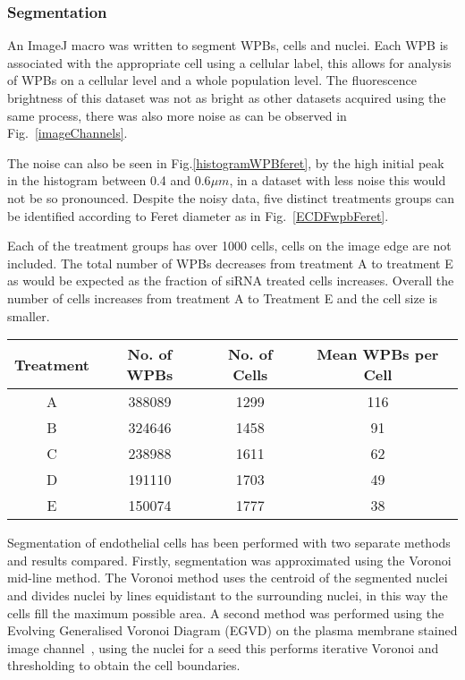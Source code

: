 \subsubsection{Segmentation}
An ImageJ macro was written to segment WPBs, cells and nuclei. Each WPB is associated with the appropriate cell using a cellular label, this allows for analysis of WPBs on a cellular level and a whole population level. The fluorescence brightness of this dataset was not as bright as other datasets acquired using the same process, there was also more noise as can be observed in Fig.~\ref{imageChannels}. 

The noise can also be seen in Fig.\ref{histogramWPBferet}, by the high initial peak in the histogram between 0.4 and 0.6$\mu m$, in a dataset with less noise this would not be so pronounced. Despite the noisy data, five distinct treatments groups can be identified according to Feret diameter as in Fig.~\ref{ECDFwpbFeret}.

Each of the treatment groups has over 1000 cells, cells on the image edge are not included. The total number of WPBs decreases from treatment A to treatment E as would be expected as the fraction of siRNA treated cells increases. Overall the number of cells increases from treatment A to Treatment E and the cell size is smaller.
\begin{center}
	\footnotesize
	\begin{tabular}{|c|c|c|c|} \hline
		Treatment & No. of WPBs & No. of Cells & Mean WPBs per Cell \\ \hline
		A & 388089 & 1299 & 116 \\ 
		B & 324646 & 1458 & 91  \\ 
		C & 238988 & 1611 & 62  \\ 
		D & 191110 & 1703 & 49  \\ 
		E & 150074 & 1777 & 38  \\ \hline
	\end{tabular}
\end{center}

Segmentation of endothelial cells has been performed with two separate methods and results compared. Firstly, segmentation was approximated using the Voronoi mid-line method. The Voronoi method uses the centroid of the segmented nuclei and divides nuclei by lines equidistant to the surrounding nuclei, in this way the cells fill the maximum possible area. A second method was performed using the Evolving Generalised Voronoi Diagram (EGVD) on the plasma membrane stained image channel~\cite{Yu2010}, using the nuclei for a seed this performs iterative Voronoi and thresholding to obtain the cell boundaries. 

